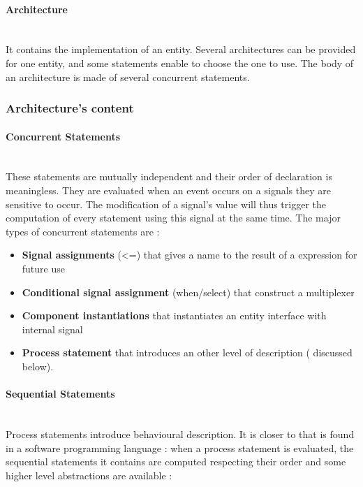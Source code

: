 \documentclass[10pt,a4paper]{article}
\begin{document}
\paragraph{Architecture}~\\
It contains the implementation of an entity. Several architectures can be provided for one entity, and some statements enable to choose the one to use. The body of an architecture is made of several concurrent statements.

\subsubsection{Architecture's content}

\paragraph{Concurrent Statements}
~\\ \label{Concurr}
These statements are mutually independent and their order of declaration is meaningless. They are evaluated when an event occurs on a signals they are sensitive to occur. The modification of a signal's value will thus trigger the computation of every statement using this signal at the same time. The major types of concurrent statements are :

\begin{itemize}
	\item \textbf{Signal assignments} (\textless=) that gives a name to the result of a expression for future use
	\item \textbf{Conditional signal assignment} (when/select) that construct a multiplexer
	\item \textbf{Component instantiations} that instantiates an entity interface with internal signal
	\item \textbf{Process statement} that introduces an other level of description ( discussed below).
\end{itemize}


\paragraph{Sequential Statements}
~\\
Process statements introduce behavioural description. It is closer to that is found in a software programming language : when a process statement is evaluated, the sequential statements it contains are computed respecting their order and some higher level abstractions are available :
\end{document}
